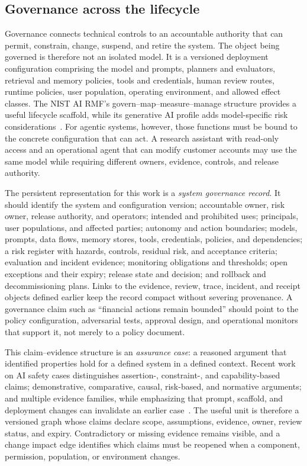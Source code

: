 \subsection{Governance across the lifecycle}

Governance connects technical controls to an accountable authority that can permit, constrain, change, suspend, and retire the system. The object being governed is therefore not an isolated model. It is a versioned deployment configuration comprising the model and prompts, planners and evaluators, retrieval and memory policies, tools and credentials, human review routes, runtime policies, user population, operating environment, and allowed effect classes. The NIST AI RMF's govern--map--measure--manage structure provides a useful lifecycle scaffold, while its generative AI profile adds model-specific risk considerations~\cite{nist2023airmf,nist2024genaiprofile}. For agentic systems, however, those functions must be bound to the concrete configuration that can act. A research assistant with read-only access and an operational agent that can modify customer accounts may use the same model while requiring different owners, evidence, controls, and release authority.

The persistent representation for this work is a \emph{system governance record}. It should identify the system and configuration version; accountable owner, risk owner, release authority, and operators; intended and prohibited uses; principals, user populations, and affected parties; autonomy and action boundaries; models, prompts, data flows, memory stores, tools, credentials, policies, and dependencies; a risk register with hazards, controls, residual risk, and acceptance criteria; evaluation and incident evidence; monitoring obligations and thresholds; open exceptions and their expiry; release state and decision; and rollback and decommissioning plans. Links to the evidence, review, trace, incident, and receipt objects defined earlier keep the record compact without severing provenance. A governance claim such as ``financial actions remain bounded'' should point to the policy configuration, adversarial tests, approval design, and operational monitors that support it, not merely to a policy document.

This claim--evidence structure is an \emph{assurance case}: a reasoned argument that identified properties hold for a defined system in a defined context. Recent work on AI safety cases distinguishes assertion-, constraint-, and capability-based claims; demonstrative, comparative, causal, risk-based, and normative arguments; and multiple evidence families, while emphasizing that prompt, scaffold, and deployment changes can invalidate an earlier case~\cite{lee2026safetycases}. The useful unit is therefore a versioned graph whose claims declare scope, assumptions, evidence, owner, review status, and expiry. Contradictory or missing evidence remains visible, and a change impact edge identifies which claims must be reopened when a component, permission, population, or environment changes.

